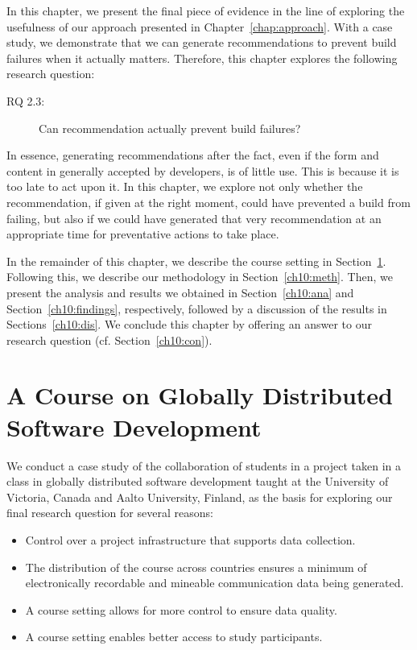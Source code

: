 \label{chap:actionable}
In this chapter, we present the final piece of evidence in the line of exploring the usefulness of our approach presented in Chapter~\ref{chap:approach}.
With a case study, we demonstrate that we can generate recommendations to prevent build failures when it actually matters.
Therefore, this chapter explores the following research question:

\begin{description}
  \item[RQ 2.3:] Can recommendation actually prevent build failures?
\end{description}

In essence, generating recommendations after the fact, even if the form and content in generally accepted by developers, is of little use.
This is because it is too late to act upon it.
In this chapter, we explore not only whether the recommendation, if given at the right moment, could have prevented a build from failing, but also if we could have generated that very recommendation at an appropriate time for preventative actions to take place.

In the remainder of this chapter, %
we describe the course setting in Section~\ref{ch10:setting}.
Following this, we describe our methodology in Section~\ref{ch10:meth}.
Then, we present the analysis and results we obtained in Section~\ref{ch10:ana} and Section~\ref{ch10:findings}, respectively, followed by a discussion of the results in Sections~\ref{ch10:dis}.
We conclude this chapter by offering an answer to our research question (cf. Section~\ref{ch10:con}).


\section{A Course on Globally Distributed Software Development}
\label{ch10:setting}
We conduct a case study of the collaboration of students in a project taken in a class in globally distributed software development taught at the University of Victoria, Canada and Aalto University, Finland, as the basis for exploring our final research question for several reasons:
\begin{itemize}
\item Control over a project infrastructure that supports data collection.
\item The distribution of the course across countries ensures a minimum of electronically recordable and mineable communication data being generated.
\item A course setting allows for more control to ensure data quality.
\item A course setting enables better access to study participants.
\end{itemize}

